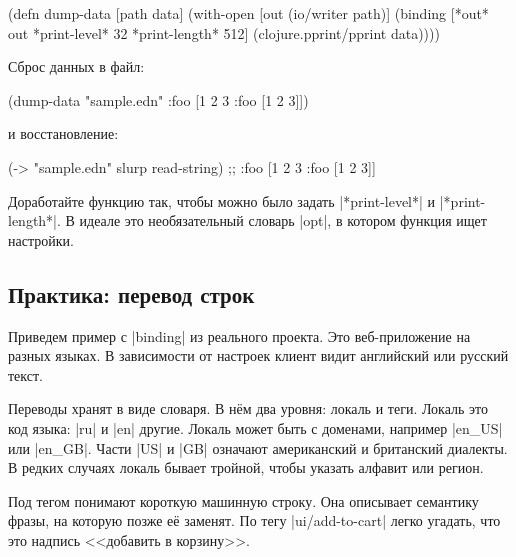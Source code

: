 \begin{english}
  \begin{clojure}
(defn dump-data
  [path data]
  (with-open [out (io/writer path)]
    (binding [*out* out
              *print-level* 32
              *print-length* 512]
      (clojure.pprint/pprint data))))
  \end{clojure}
\end{english}

\noindent
Сброс данных в файл:

\begin{english}
  \begin{clojure}
(dump-data "sample.edn" {:foo [1 2 3 {:foo [1 2 3]}]})
  \end{clojure}
\end{english}

\noindent
и восстановление:

\begin{english}
  \begin{clojure}
(-> "sample.edn" slurp read-string)
;; {:foo [1 2 3 {:foo [1 2 3]}]}
  \end{clojure}
\end{english}


Доработайте функцию так, чтобы можно было задать \spverb|*print-level*| и
\spverb|*print-length*|. В идеале это необязательный словарь \spverb|opt|, в
котором функция ищет настройки.

\subsection{Практика: перевод строк}

\label{translate}

Приведем пример с \spverb|binding| из реального проекта. Это веб-приложение на
разных языках. В зависимости от настроек клиент видит английский или русский
текст.


Переводы хранят в виде словаря. В н\"{е}м два уровня: локаль и теги. Локаль это код
языка: \spverb|ru| и \spverb|en| другие. Локаль может быть с доменами, например
\spverb|en_US| или \spverb|en_GB|. Части \spverb|US| и \spverb|GB| означают
американский и британский диалекты. В редких случаях локаль бывает тройной,
чтобы указать алфавит или регион.

Под тегом понимают короткую машинную строку. Она описывает семантику фразы, на
которую позже е\"{е} заменят. По тегу \spverb|ui/add-to-cart| легко
угадать, что это надпись <<добавить в корзину>>.

